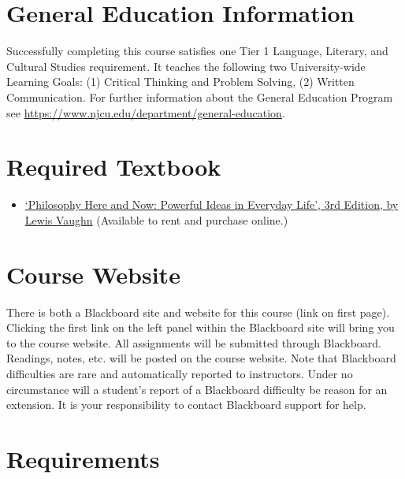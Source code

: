 \documentclass[article,oneside]{memoir}
\begin{document}
\section{General Education Information} 
Successfully completing this course satisfies one Tier 1 Language, Literary, and Cultural Studies requirement. It teaches the following two University-wide Learning Goals: (1) Critical Thinking and Problem Solving, (2) Written Communication. For further information about the General Education Program see \href{https://www.njcu.edu/department/general-education}{https://www.njcu.edu/department/general-education}.


\section{Required Textbook}

\begin{itemize}
\item
  \href{https://www.vitalsource.com/products/philosophy-here-and-now-lewis-vaughn-v9780190852351}{`Philosophy  Here and Now: Powerful Ideas in Everyday Life', 3rd Edition, by Lewis Vaughn}  (Available to rent and purchase online.)
\end{itemize}


\section{Course Website}
There is both a Blackboard site and website for this course (link on first page). Clicking the first link on the left panel within the Blackboard site will bring you to the course website. All assignments will be submitted through Blackboard. Readings, notes, etc. will be posted on the course website. Note that Blackboard difficulties are rare and automatically reported to instructors. Under no circumstance will a student's report of a Blackboard difficulty be reason for an extension. It is your responsibility to contact Blackboard support for help.




\section{Requirements}
\end{document}
